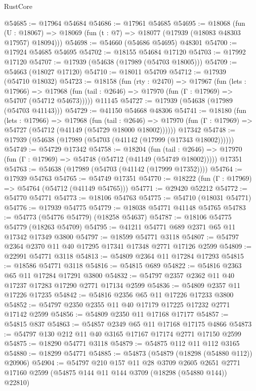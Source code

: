 \begin{lexlean}{RustCore}
\begin{coremodule}
@54685 := @17964 @54684
@54686 := @17961 @54685
@54695 := @18068
    (fun (U : @18067) => @18069 (fun (t : @7) => @18077 (@17939 (@18083 @48303 @17957) @18094)))
@54698 := @54660 (@54686 @54695) @48301
@54700 := @17924 @54685 @54695
@54702 := @18155 @54684 @17120
@54703 := @17992 @17120
@54707 := @17939 (@54638 (@17989 (@54703 @18005)))
@54709 := @54663 (@18027 @17120)
@54710 := @18011 @54709
@54712 := @17939 (@54710 @18032)
@54723 := @18158
    (fun (rty : @2470) =>
    @17967
      (fun (lets : @17966) =>
      @17968 (fun (tail : @2646) => @17970 (fun (Γ : @17969) => @54707 (@54712 @54673)))))
    @11145
@54727 := @17939 (@54638 (@17989 (@54703 @41143)))
@54729 := @41150 @54668 @48306
@54741 := @18180
    (fun (lets : @17966) =>
    @17968
      (fun (tail : @2646) =>
      @17970 (fun (Γ : @17969) => @54727 (@54712 (@41149 (@54729 @18000 @18002))))))
    @17342
@54748 := @17939 (@54638 (@17989 (@54703 (@41142 (@17999 (@17343 @18002))))))
@54749 := @54729 @17342
@54758 := @18204
    (fun (tail : @2646) => @17970 (fun (Γ : @17969) => @54748 (@54712 (@41149 (@54749 @18002)))))
    @17351
@54763 := @54638 (@17989 (@54703 (@41142 (@17999 @17352))))
@54764 := @17939 @54763
@54765 := @54749 @17351
@54770 := @18222 (fun (Γ : @17969) => @54764 (@54712 (@41149 @54765)))
@54771 := @29420 @52212
@54772 := @54770 @54771
@54773 := @18106 @54763
@54775 := @54710 (@18031 @54771)
@54776 := @17939 @54775
@54779 := @18038 @54771 @41148 @54765
@54783 := @54773 (@54776 @54779) (@18258 @54637)
@54787 := @18106 @54775 @54779 (@18263 @54709)
@54795 := @41211 @54771 @689 @2371 @65 @11 @17342 @17349 @3800
@54797 := @18599 @54771 @3118
@54807 := @54797 @2364 @2370 @11 @40 @17295 @17341 @17348 @2771 @17126 @2599
@54809 := @22991 @54771 @3118
@54813 := @54809 @2364 @11 @17284 @17293
@54815 := @18586 @54771 @3118
@54816 := @54815 @689
@54822 := @54816 @2363 @65 @11 @17284 @17291 @3800
@54832 := @54797 @2357 @2362 @11 @40 @17237 @17283 @17290 @2771 @17134 @2599
@54836 := @54809 @2357 @11 @17226 @17235
@54842 := @54816 @2356 @65 @11 @17226 @17233 @3800
@54852 := @54797 @2350 @2355 @11 @40 @17179 @17225 @17232 @2771 @17142 @2599
@54856 := @54809 @2350 @11 @17168 @17177
@54857 := @54815 @837
@54863 := @54857 @2349 @65 @11 @17168 @17175 @4866
@54873 := @54797 @130 @212 @11 @40 @3165 @17167 @17174 @2771 @17150 @2599
@54875 := @18290 @54771 @3118
@54879 := @54875 @112 @11 @112 @3165
@54880 := @18299 @54771
@54885 := @54873 (@54879 (@18298 (@54880 @112)) @20906)
@54904 := @54797
    @210
    @157
    @11
    @28
    @3709
    @2605
    @2651
    @2771
    @17160
    @2599
    (@54875 @144 @11 @144 @3709 (@18298 (@54880 @144)) @22810)

\end{coremodule}
\end{lexlean}
